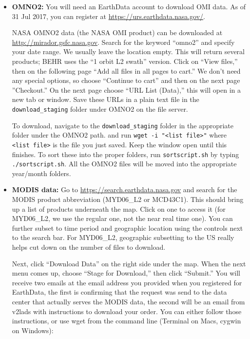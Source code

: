 \documentclass[12pt]{article}
\begin{document}
	\begin{itemize}
	
	\item \textbf{OMNO2:}
		You will need an EarthData account to download OMI data. As of 31 Jul 2017, you can register at \url{https://urs.earthdata.nasa.gov/}.	
	
		NASA OMNO2 data (the NASA OMI  product) can be downloaded at \url{http://mirador.gsfc.nasa.gov}. Search for the keyword ``omno2'' and specify your date range. We usually leave the location empty. This will return several products; BEHR uses the ``1 orbit L2 swath'' version. Click on ``View files,'' then on the following page ``Add all files in all pages to cart.''  We don't need any special options, so choose ``Continue to cart'' and then on the next page ''Checkout.'' On the next page choose ``URL List (Data),'' this will open in a new tab or window. Save these URLs in a plain text file in the \texttt{download\_staging} folder under OMNO2 on the file server. 
		
		To download, navigate to the \texttt{download\_staging} folder in the appropriate  folder under the OMNO2 path. and run \texttt{wget -i "<list file>"} where \texttt{<list file>} is the file you just saved. Keep the window open until this finishes. To sort these into the proper folders, run \texttt{sortscript.sh} by typing \texttt{./sortscript.sh}. All the OMNO2 files will be moved into the appropriate year/month folders.
	
	\item \textbf{MODIS data:}
		Go to \url{https://search.earthdata.nasa.gov} and search for the MODIS product abbreviation (MYD06\_L2 or MCD43C1). This should bring up a list of products underneath the map. Click on one to access it (for MYD06\_L2, we use the regular one, not the near real time one). You can further subset to time period and geographic location using the controls next to the search bar. For MYD06\_L2, geographic subsetting to the US really helps cut down on the number of files to download.
		
		Next, click ``Download Data'' on the right side under the map. When the next menu comes up, choose ``Stage for Download,'' then click ``Submit.'' You will receive two emails at the email address you provided when you registered for EarthData, the first is confirming that the request was send to the data center that actually serves the MODIS data, the second will be an email from v2lads with instructions to download your order. You can either follow those instructions, or use wget from the command line (Terminal on Macs, cygwin on Windows):
		

\end{itemize}
\end{document}
